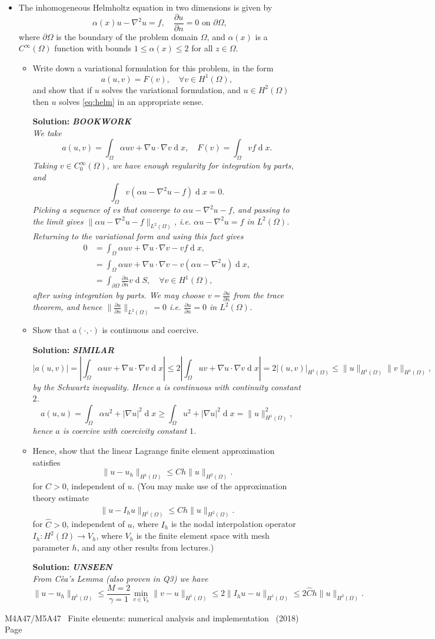 \documentclass[12pt]{article}
\newcommand{\coursenum}{M4A47/M5A47} %
\newcommand{\coursename}{Finite elements: numerical analysis and implementation} %
\newcommand{\soln}[1]{{\bfseries Solution:} {\itshape \color{blue} #1}}
\newcommand{\soln}[1]{}
\newcommand{\exammarks}[1]{\begin{flushright}[#1 marks]\end{flushright}}%
\DeclareMathOperator{\diff}{d}
\newcommand{\pp}[2]{\frac{\partial #1}{\partial #2}}
\newcommand{\bookwork}{{\bfseries BOOKWORK\\}}
\newcommand{\similar}{{\bfseries SIMILAR\\}}
\newcommand{\unseen}{{\bfseries UNSEEN\\}}
\newcommand{\examyear}{2018}
\newenvironment{Question}[1] 
 {\begin{itemize} \item[\large #1.~~]}{\end{itemize} \medskip}
\newcommand{\EndPage}{
	\vfill \coursenum ~ \coursename ~
	(\examyear) \hfill Page \thepage \newpage
	}
\newcommand{\BeginParts}{\begin{itemize}}
\newcommand{\Part}[1]{\item [(#1)~~]}
\newcommand{\EndParts}{\end{itemize}}
\begin{document}
\begin{Question}{4}
The inhomogeneous Helmholtz equation in two dimensions is given by
\begin{equation}
\alpha(x)u - \nabla^2 u = f, \quad
\pp{u}{n} = 0 \mbox{ on }\partial\Omega,
\label{eq:helm}
\end{equation}
where $\partial\Omega$ is the boundary of the problem domain $\Omega$,
and $\alpha(x)$ is a $C^\infty(\Omega)$ function with bounds $1 \leq
\alpha(x) \leq 2$ for all $z\in \Omega$.
\BeginParts
\Part{a}
Write down a variational formulation for this problem, in the form
\[
a(u, v) = F (v),
\quad \forall v \in H^1(\Omega),
\]
and show that if $u$ solves the variational formulation, and $u\in
H^2(\Omega)$ then $u$ solves \eqref{eq:helm} in an appropriate sense.
\exammarks{6}
\soln{\bookwork
  We take
  \[
  a(u,v) = \int_\Omega \alpha uv + \nabla u\cdot \nabla v \diff x,
  \quad F(v) = \int_\Omega vf\diff x.
  \]
  Taking $v\in C_0^\infty(\Omega)$, we have enough regularity for
  integration by parts, and
  \[
  \int_\Omega v(\alpha u - \nabla^2 u - f)\diff x = 0.
  \]
  Picking a sequence of $v$s that converge to $\alpha u - \nabla^2 u - f$,
  and passing to the limit gives $\|\alpha u - \nabla^2u -f \|_{L^2(\Omega)}$,
  i.e. $\alpha u - \nabla^2u = f$ in $L^2(\Omega)$. Returning to
  the variational form and using this fact gives
  \begin{align*}
    0 & = \int_\Omega \alpha uv + \nabla u\cdot \nabla v - vf\diff x,
    \\ & = \int_\Omega \alpha uv + \nabla u\cdot \nabla v - v(\alpha u
    - \nabla^2 u)\diff x, \\
    & = \int_{\partial\Omega} \pp{u}{n} v \diff S, \quad \forall v \in H^1(\Omega),
  \end{align*}
  after using integration by parts. We may choose $v = \pp{u}{n}$ from
  the trace theorem, and hence $\|\pp{u}{n}\|_{L^2(\Omega)}=0$ i.e.
  $\pp{u}{n}=0$ in $L^2(\Omega)$.
  }
\Part{b} Show that $a(\cdot,\cdot)$ is continuous and coercive.
\exammarks{6}
\soln{\similar
\[
|a(u,v)| = |\int_\Omega \alpha uv + \nabla u\cdot \nabla v \diff x|
\leq 2|\int_\Omega uv + \nabla u\cdot \nabla v \diff x| = 2|(u,v)|_{H^1(\Omega)}
 \leq \|u\|_{H^1(\Omega)}\|v\|_{H^1(\Omega)},
 \]
 by the Schwartz inequality. Hence $a$ is continuous with continuity constant
 $2$.
 \[
 a(u,u) = \int_\Omega \alpha u^2 + |\nabla u|^2 \diff x
 \geq\int_\Omega u^2 + |\nabla u|^2 \diff x
= \|u\|_{H^1(\Omega)}^2,
\]
hence $a$ is coercive with coercivity constant $1$.}
\Part{c} Hence, show that the linear Lagrange finite element approximation
satisfies
\[
\|u-u_h\|_{H^1(\Omega)} \leq Ch\|u\|_{H^2(\Omega)}.
\]
for $C > 0$, independent of $u$. (You may make use of the
approximation theory estimate
\[
\|u-I_hu\|_{H^1(\Omega)} \leq \hat{C}h\|u\|_{H^2(\Omega)}.
\]
for $\hat{C} > 0$, independent of $u$, where $I_h$ is the nodal interpolation
operator $I_h:H^2(\Omega)\to V_h$, where $V_h$ is the finite element space
with mesh parameter $h$, and any other results from lectures.)
\exammarks{8}
\soln{\unseen
  From C\`ea's Lemma (also proven in Q3) we have
  \[
  \|u-u_h\|_{H^1(\Omega)} \leq \frac{M=2}{\gamma=1}\min_{v\in V_h}
  \|v-u\|_{H^1(\Omega)} \leq 2\|I_hu - u \|_{H^1(\Omega)}
  \leq 2\hat{C}h\|u\|_{H^2(\Omega)}.
  \]
  }
\EndParts
\end{Question}
\EndPage
\label{ptotal}
\end{document}
